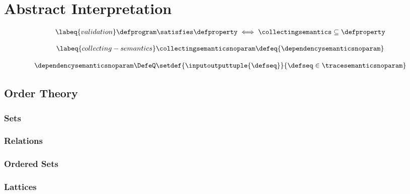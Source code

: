 
\chapter{Abstract Interpretation}


\begin{definition}[Validation]
  \begin{align}
    \labeq{validation}
    \defprogram \satisfies \defproperty \iff \collectingsemantics \subseteq \defproperty
  \end{align}
\end{definition}

\begin{definition}
  \begin{align}
    \labeq{collecting-semantics}
    \collectingsemanticsnoparam \defeq \{ \dependencysemanticsnoparam \}
  \end{align}
\end{definition}

\begin{definition}
  \begin{align*}
    \dependencysemanticsnoparam \DefeQ \setdef{\inputoutputtuple{\defseq}}{\defseq\in\tracesemanticsnoparam}
  \end{align*}
\end{definition}


\section{Order Theory}

\subsection{Sets}

\subsection{Relations}

\subsection{Ordered Sets}

\subsection{Lattices}

